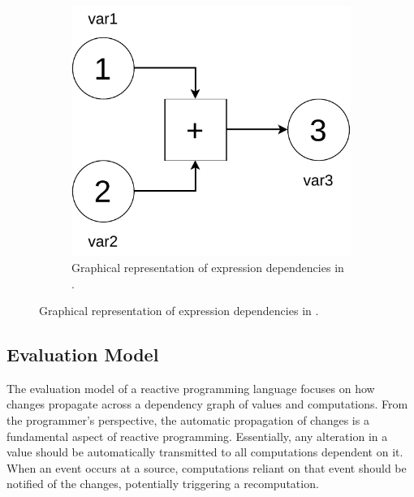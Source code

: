\begin{figure}
    \centering
    \begin{subfigure}[b]{\textwidth}
        \centering
        
    \end{subfigure}
    \hfill
    \begin{subfigure}[b]{0.5\textwidth}
        \centering
        \includegraphics[width=\linewidth]{figures/reactive-example.pdf}
            \caption{Graphical representation of expression dependencies in .}
    \end{subfigure}
\end{figure}

\subsection{Evaluation Model}

The evaluation model of a reactive programming language focuses on how changes propagate across a dependency graph of values and computations. From the programmer's perspective, the automatic propagation of changes is a fundamental aspect of reactive programming. Essentially, any alteration in a value should be automatically transmitted to all computations dependent on it. When an event occurs at a source, computations reliant on that event should be notified of the changes, potentially triggering a recomputation.

